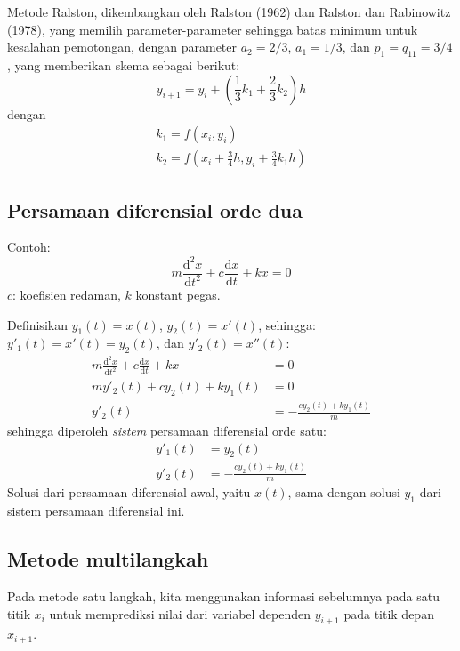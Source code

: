 Metode Ralston, dikembangkan oleh Ralston (1962) dan Ralston dan Rabinowitz (1978),
yang memilih parameter-parameter sehingga batas minimum untuk kesalahan pemotongan,
dengan parameter $a_2 = 2/3$, $a_1 = 1/3$, dan $p_1 = q_{11} = 3/4$, yang
memberikan skema sebagai berikut:
\begin{equation*}
y_{i+1} = y_i + \left( \frac{1}{3}k_1 + \frac{2}{3}k_2 \right) h
\end{equation*}
dengan
\begin{align*}
k_1 = f(x_i, y_i) \\
k_2 = f\left( x_i + \frac{3}{4}h, y_i + \frac{3}{4}k_1 h \right)
\end{align*}



\subsection*{Persamaan diferensial orde dua}

Contoh:
\begin{equation*}
m \frac{\mathrm{d}^2 x}{\mathrm{d}t^2} + c \frac{\mathrm{d}x}{\mathrm{d}t} + kx = 0
\end{equation*}
$c$: koefisien redaman, $k$ konstant pegas.

Definisikan $y_{1}(t) = x(t)$, $y_{2}(t) = x'(t)$, sehingga:
$y'_{1}(t) = x'(t) = y_{2}(t)$, dan
$y'_{2}(t) = x''(t)$:
\begin{align*}
m \frac{\mathrm{d}^2 x}{\mathrm{d}t^2} + c \frac{\mathrm{d}x}{\mathrm{d}t} + kx & = 0 \\
m y'_{2}(t) + c y_{2}(t) + k y_{1}(t) & = 0 \\
y'_{2}(t) & = -\frac{c y_{2}(t) + k y_{1}(t)}{m}
\end{align*}
sehingga diperoleh \textit{sistem} persamaan diferensial orde satu:
\begin{align*}
y'_{1}(t) & = y_{2}(t) \\
y'_{2}(t) & = -\frac{c y_{2}(t) + k y_{1}(t)}{m}
\end{align*}
Solusi dari persamaan diferensial awal, yaitu $x(t)$, sama dengan solusi $y_{1}$ dari sistem
persamaan diferensial ini.




\subsection*{Metode multilangkah}

Pada metode satu langkah, kita menggunakan informasi sebelumnya pada satu titik $x_i$ untuk
memprediksi nilai dari variabel dependen $y_{i+1}$ pada titik depan $x_{i+1}$.

